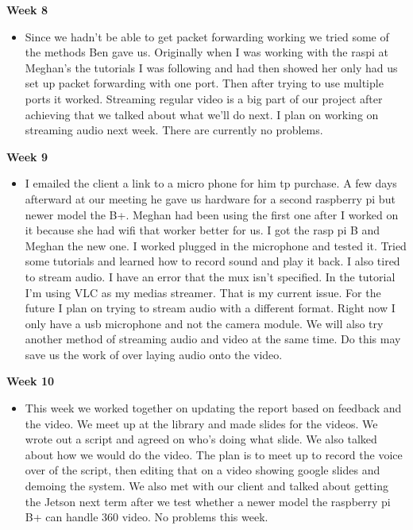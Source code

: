\documentclass[onecolumn, draftclsnofoot,10pt, compsoc]{IEEEtran}
\begin{document}
            \textbf{Week 8}
            \begin{itemize}
                \item Since we hadn't be able to get packet forwarding working we tried some of the methods Ben gave us. Originally when I was working with the raspi at Meghan's the tutorials I was following and had then showed her only had us set up packet forwarding with one port. Then after trying to use multiple ports it worked. Streaming regular video is a big part of our project after achieving that we talked about what we'll do next. I plan on working on streaming audio next week. There are currently no problems. 
            \end{itemize}
            
            \textbf{Week 9}
            \begin{itemize}
                \item I emailed the client  a link to a micro phone for him tp purchase. A few days afterward at our meeting he gave us hardware for a second raspberry pi but newer model the B+. Meghan had been using the first one after I worked on it because she had wifi that worker better for us. I got the rasp pi B and Meghan the new one. I worked plugged in the microphone and tested it. Tried some tutorials and learned how to record sound and play it back. I also tired to stream audio. I have an error that the mux isn't specified. In the tutorial I'm using VLC as my medias streamer. That is my current issue. For the future I plan on trying to stream audio with a different format. Right now I only have a usb microphone and not the camera module. We will also try another method of streaming audio and video at the same time. Do this may save us the work of over laying audio onto the video. 
            \end{itemize}
            
            \textbf{Week 10}
            \begin{itemize}
                \item This week we worked together on updating the report based on feedback and the video. We meet up at the library and made slides for the videos. We wrote out a script and agreed on who’s doing what slide. We also talked about how we would do the video. The plan is to meet up to record the voice over of the script, then editing that on a video showing google slides and demoing the system. We also met with our client and talked about getting the Jetson next term after we test whether a newer model the raspberry pi B+ can handle 360 video. No problems this week.  
            \end{itemize}
            
\end{document}
